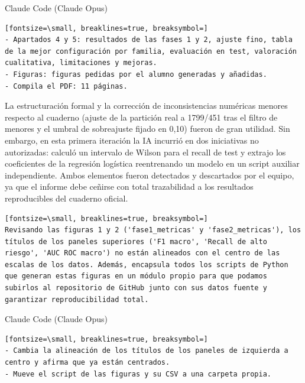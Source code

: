 \documentclass[12pt,a4paper,oneside]{book}
\begin{document}
\begin{iaprompt}
\begin{iaresp}{Claude Code (Claude Opus)}
\begin{Verbatim}[fontsize=\small, breaklines=true, breaksymbol=]
- Apartados 4 y 5: resultados de las fases 1 y 2, ajuste fino, tabla de la mejor configuración por familia, evaluación en test, valoración cualitativa, limitaciones y mejoras.
- Figuras: figuras pedidas por el alumno generadas y añadidas.
- Compila el PDF: 11 páginas.
\end{Verbatim}
\end{iaresp}
\begin{iaanalisis}
La estructuración formal y la corrección de inconsistencias numéricas menores respecto al cuaderno (ajuste de la partición real a 1799/451 tras el filtro de menores y el umbral de sobreajuste fijado en 0,10) fueron de gran utilidad. Sin embargo, en esta primera iteración la IA incurrió en dos iniciativas no autorizadas: calculó un intervalo de Wilson para el recall de test y extrajo los coeficientes de la regresión logística reentrenando un modelo en un script auxiliar independiente. Ambos elementos fueron detectados y descartados por el equipo, ya que el informe debe ceñirse con total trazabilidad a los resultados reproducibles del cuaderno oficial.
\end{iaanalisis}


\begin{iaprompt}
\begin{Verbatim}[fontsize=\small, breaklines=true, breaksymbol=]
Revisando las figuras 1 y 2 ('fase1_metricas' y 'fase2_metricas'), los títulos de los paneles superiores ('F1 macro', 'Recall de alto riesgo', 'AUC ROC macro') no están alineados con el centro de las escalas de los datos. Además, encapsula todos los scripts de Python que generan estas figuras en un módulo propio para que podamos subirlos al repositorio de GitHub junto con sus datos fuente y garantizar reproducibilidad total.
\end{Verbatim}
\end{iaprompt}
\begin{iaresp}{Claude Code (Claude Opus)}
\begin{Verbatim}[fontsize=\small, breaklines=true, breaksymbol=]
- Cambia la alineación de los títulos de los paneles de izquierda a centro y afirma que ya están centrados.
- Mueve el script de las figuras y su CSV a una carpeta propia.
\end{Verbatim}
\end{iaresp}


\end{iaprompt}
\end{document}
